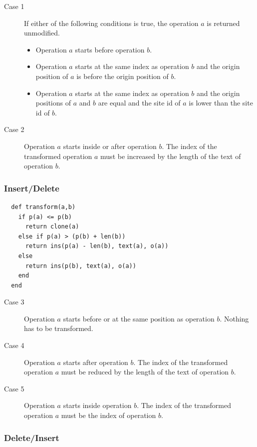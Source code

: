 \begin{description}
 \item[Case 1] If either of the following conditions is true, the operation $a$ is returned unmodified.
 \begin{itemize}
  \item Operation $a$ starts before operation $b$.
  \item Operation $a$ starts at the same index as operation $b$ and the origin position of $a$ is before the origin position of $b$.
  \item Operation $a$ starts at the same index as operation $b$ and the origin positions of $a$ and $b$ are equal and the site id of $a$ is lower than the site id of $b$.
 \end{itemize}
 \item[Case 2] Operation $a$ starts inside or after operation $b$. The index of the transformed operation $a$ must be increased by the length of the text of operation $b$.
\end{description}


\subsubsection{Insert/Delete}

\small{\begin{verbatim}
  def transform(a,b)
    if p(a) <= p(b)
      return clone(a)
    else if p(a) > (p(b) + len(b))
      return ins(p(a) - len(b), text(a), o(a))
    else 
      return ins(p(b), text(a), o(a))
    end
  end
\end{verbatim}}

\begin{description}
 \item[Case 3] Operation $a$ starts before or at the same position as operation $b$. Nothing has to be transformed.
 \item[Case 4] Operation $a$ starts after operation $b$. The index of the transformed operation $a$ must be reduced by the length of the text of operation $b$.
 \item[Case 5] Operation $a$ starts inside operation $b$. The index of the transformed operation $a$ must be the index of operation $b$.
\end{description}


\subsubsection{Delete/Insert}

